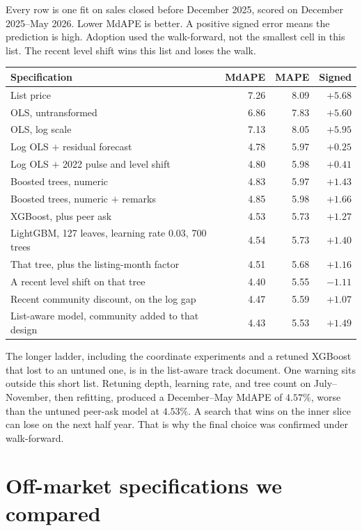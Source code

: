 \documentclass[11pt]{article}
\begin{document}
Every row is one fit on sales closed before December 2025, scored on December 2025--May 2026. Lower MdAPE is better. A positive signed error means the prediction is high. Adoption used the walk-forward, not the smallest cell in this list. The recent level shift wins this list and loses the walk.

\begin{center}
\small
\begin{tabular}{p{9.4cm}rrr}
\toprule
Specification & MdAPE & MAPE & Signed \\
\midrule
List price & 7.26 & 8.09 & \(+5.68\) \\
OLS, untransformed & 6.86 & 7.83 & \(+5.60\) \\
OLS, log scale & 7.13 & 8.05 & \(+5.95\) \\
Log OLS \(+\) residual forecast & 4.78 & 5.97 & \(+0.25\) \\
Log OLS \(+\) 2022 pulse and level shift & 4.80 & 5.98 & \(+0.41\) \\
Boosted trees, numeric & 4.83 & 5.97 & \(+1.43\) \\
Boosted trees, numeric \(+\) remarks & 4.85 & 5.98 & \(+1.66\) \\
XGBoost, plus peer ask & 4.53 & 5.73 & \(+1.27\) \\
LightGBM, 127 leaves, learning rate 0.03, 700 trees & 4.54 & 5.73 & \(+1.40\) \\
That tree, plus the listing-month factor & 4.51 & 5.68 & \(+1.16\) \\
A recent level shift on that tree & 4.40 & 5.55 & \(-1.11\) \\
Recent community discount, on the log gap & 4.47 & 5.59 & \(+1.07\) \\
List-aware model, community added to that design & 4.43 & 5.53 & \(+1.49\) \\
\bottomrule
\end{tabular}
\end{center}

The longer ladder, including the coordinate experiments and a retuned XGBoost that lost to an untuned one, is in the list-aware track document. One warning sits outside this short list. Retuning depth, learning rate, and tree count on July--November, then refitting, produced a December--May MdAPE of \(4.57\%\), worse than the untuned peer-ask model at \(4.53\%\). A search that wins on the inner slice can lose on the next half year. That is why the final choice was confirmed under walk-forward.

\section{Off-market specifications we compared}
\label{app:ladder-om}
\end{document}
